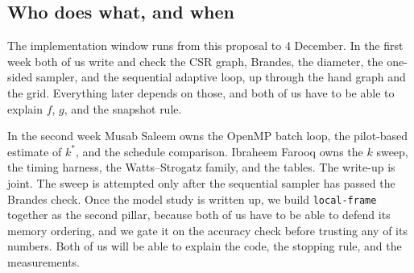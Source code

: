 \documentclass[11pt]{article}
\begin{document}
\subsection{Who does what, and when}

The implementation window runs from this proposal to 4 December. In the first week both of us write and check the CSR graph, Brandes, the diameter, the one-sided sampler, and the sequential adaptive loop, up through the hand graph and the grid. Everything later depends on those, and both of us have to be able to explain $f$, $g$, and the snapshot rule.

In the second week Musab Saleem owns the OpenMP batch loop, the pilot-based estimate of $k^\ast$, and the schedule comparison. Ibraheem Farooq owns the $k$ sweep, the timing harness, the Watts--Strogatz family, and the tables. The write-up is joint. The sweep is attempted only after the sequential sampler has passed the Brandes check. Once the model study is written up, we build \texttt{local-frame} together as the second pillar, because both of us have to be able to defend its memory ordering, and we gate it on the accuracy check before trusting any of its numbers. Both of us will be able to explain the code, the stopping rule, and the measurements.
\end{document}
